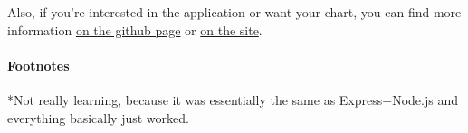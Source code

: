 \documentclass[12pt]{article}
\begin{document}
Also, if you're interested in the application or want your chart, you
can find more information
\href{https://github.com/2016rshah/githubchart-api}{on the github page}
or \href{http://ghchart.rshah.org/}{on the site}.

\paragraph{Footnotes}\label{footnotes}

*Not really learning, because it was essentially the same as
Express+Node.js and everything basically just worked.
\end{document}
